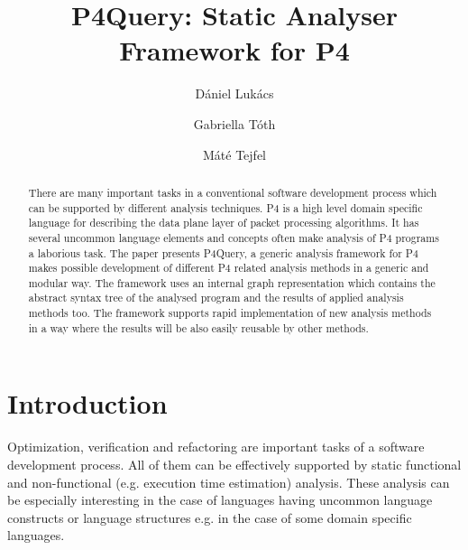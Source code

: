\documentclass[sigconf]{acmart}
\begin{document}
	
	
	\title{P4Query: Static Analyser Framework for P4}
	
	
	\author{Dániel Lukács}
	
	\author{Gabriella Tóth}
	
	\author{Máté Tejfel}
	
	
	\begin{abstract}
		There are many important tasks in a conventional software development process which can be supported by different analysis techniques. P4 is a high level domain specific language for
describing the data plane layer of packet processing algorithms. It has several uncommon language elements and concepts often make analysis of P4 programs a laborious task. 
The paper presents P4Query, a generic analysis framework for P4 makes possible development of different P4 related analysis methods in a generic and modular way. The framework uses an internal graph representation which contains the abstract syntax tree of the analysed program and the results of applied analysis methods too. The framework supports rapid implementation of new analysis methods in a way where the results will be also easily reusable by other methods. 

	\end{abstract}
	

	
	
	
	\maketitle
	
	\section{Introduction}
	  Optimization, verification and refactoring are important tasks of a software development process. All of them can be effectively supported by static functional and non-functional (e.g. execution time estimation) analysis. These analysis can be especially interesting in the case of languages having uncommon language constructs or language structures e.g. in the case of some domain specific languages. 
	
\end{document}
